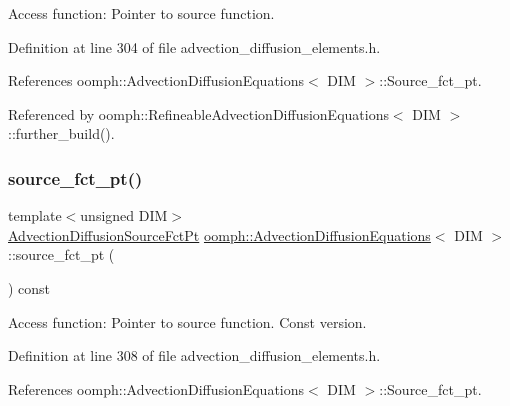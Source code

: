 Access function\+: Pointer to source function. 



Definition at line 304 of file advection\+\_\+diffusion\+\_\+elements.\+h.



References oomph\+::\+Advection\+Diffusion\+Equations$<$ D\+I\+M $>$\+::\+Source\+\_\+fct\+\_\+pt.



Referenced by oomph\+::\+Refineable\+Advection\+Diffusion\+Equations$<$ D\+I\+M $>$\+::further\+\_\+build().

\mbox{\label{classoomph_1_1AdvectionDiffusionEquations_a7579712ec3c4ec95c5144d37bf4264a6}} 
\subsubsection{\texorpdfstring{source\+\_\+fct\+\_\+pt()}{source\_fct\_pt()}\hspace{0.1cm}{\footnotesize\ttfamily [2/2]}}
{\footnotesize\ttfamily template$<$unsigned D\+IM$>$ \\
\hyperlink{classoomph_1_1AdvectionDiffusionEquations_aa892578e0cffe209775da9f5ac84bd03}{Advection\+Diffusion\+Source\+Fct\+Pt} \hyperlink{classoomph_1_1AdvectionDiffusionEquations}{oomph\+::\+Advection\+Diffusion\+Equations}$<$ D\+IM $>$\+::source\+\_\+fct\+\_\+pt (\begin{DoxyParamCaption}{ }\end{DoxyParamCaption}) const\hspace{0.3cm}{\ttfamily [inline]}}



Access function\+: Pointer to source function. Const version. 



Definition at line 308 of file advection\+\_\+diffusion\+\_\+elements.\+h.



References oomph\+::\+Advection\+Diffusion\+Equations$<$ D\+I\+M $>$\+::\+Source\+\_\+fct\+\_\+pt.

\mbox{\label{classoomph_1_1AdvectionDiffusionEquations_aadffa26c42be5d4a1156a7467de48fb8}} 
